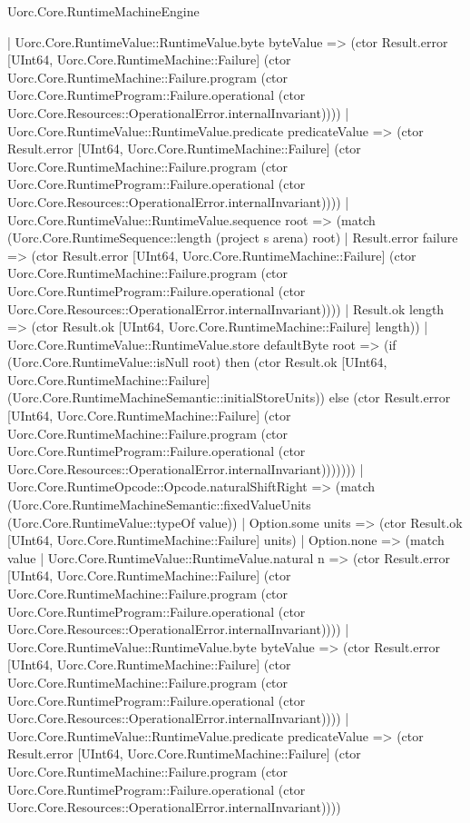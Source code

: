\begin{lexlean}{Uorc.Core.RuntimeMachineEngine}
\begin{semanticmodule}
{              | Uorc.Core.RuntimeValue::RuntimeValue.byte byteValue => (ctor Result.error [UInt64, Uorc.Core.RuntimeMachine::Failure] (ctor Uorc.Core.RuntimeMachine::Failure.program (ctor Uorc.Core.RuntimeProgram::Failure.operational (ctor Uorc.Core.Resources::OperationalError.internalInvariant))))
              | Uorc.Core.RuntimeValue::RuntimeValue.predicate predicateValue => (ctor Result.error [UInt64, Uorc.Core.RuntimeMachine::Failure] (ctor Uorc.Core.RuntimeMachine::Failure.program (ctor Uorc.Core.RuntimeProgram::Failure.operational (ctor Uorc.Core.Resources::OperationalError.internalInvariant))))
              | Uorc.Core.RuntimeValue::RuntimeValue.sequence root => (match (Uorc.Core.RuntimeSequence::length (project s arena) root)
                | Result.error failure => (ctor Result.error [UInt64, Uorc.Core.RuntimeMachine::Failure] (ctor Uorc.Core.RuntimeMachine::Failure.program (ctor Uorc.Core.RuntimeProgram::Failure.operational (ctor Uorc.Core.Resources::OperationalError.internalInvariant))))
                | Result.ok length => (ctor Result.ok [UInt64, Uorc.Core.RuntimeMachine::Failure] length))
              | Uorc.Core.RuntimeValue::RuntimeValue.store defaultByte root => (if (Uorc.Core.RuntimeValue::isNull root) then (ctor Result.ok [UInt64, Uorc.Core.RuntimeMachine::Failure] (Uorc.Core.RuntimeMachineSemantic::initialStoreUnits)) else (ctor Result.error [UInt64, Uorc.Core.RuntimeMachine::Failure] (ctor Uorc.Core.RuntimeMachine::Failure.program (ctor Uorc.Core.RuntimeProgram::Failure.operational (ctor Uorc.Core.Resources::OperationalError.internalInvariant)))))))
          | Uorc.Core.RuntimeOpcode::Opcode.naturalShiftRight => (match (Uorc.Core.RuntimeMachineSemantic::fixedValueUnits (Uorc.Core.RuntimeValue::typeOf value))
            | Option.some units => (ctor Result.ok [UInt64, Uorc.Core.RuntimeMachine::Failure] units)
            | Option.none => (match value
              | Uorc.Core.RuntimeValue::RuntimeValue.natural n => (ctor Result.error [UInt64, Uorc.Core.RuntimeMachine::Failure] (ctor Uorc.Core.RuntimeMachine::Failure.program (ctor Uorc.Core.RuntimeProgram::Failure.operational (ctor Uorc.Core.Resources::OperationalError.internalInvariant))))
              | Uorc.Core.RuntimeValue::RuntimeValue.byte byteValue => (ctor Result.error [UInt64, Uorc.Core.RuntimeMachine::Failure] (ctor Uorc.Core.RuntimeMachine::Failure.program (ctor Uorc.Core.RuntimeProgram::Failure.operational (ctor Uorc.Core.Resources::OperationalError.internalInvariant))))
              | Uorc.Core.RuntimeValue::RuntimeValue.predicate predicateValue => (ctor Result.error [UInt64, Uorc.Core.RuntimeMachine::Failure] (ctor Uorc.Core.RuntimeMachine::Failure.program (ctor Uorc.Core.RuntimeProgram::Failure.operational (ctor Uorc.Core.Resources::OperationalError.internalInvariant))))
}
\end{semanticmodule}
\end{lexlean}
